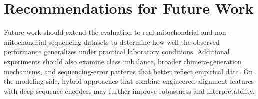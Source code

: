 \section{Recommendations for Future Work}

Future work should extend the evaluation to real mitochondrial and non-mitochondrial sequencing datasets to determine how well the observed performance generalizes under practical laboratory conditions. Additional experiments should also examine class imbalance, broader chimera-generation mechanisms, and sequencing-error patterns that better reflect empirical data. On the modeling side, hybrid approaches that combine engineered alignment features with deep sequence encoders may further improve robustness and interpretability. 

